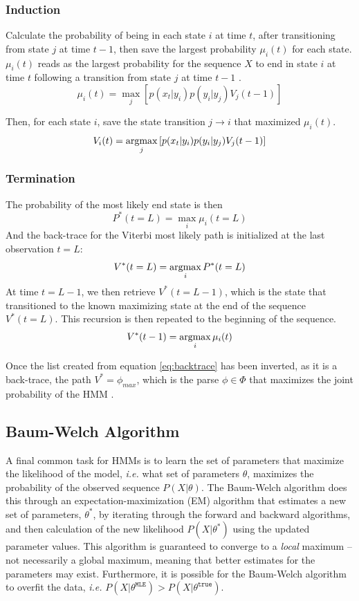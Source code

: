 \subsubsection{Induction}
Calculate the probability of being in each state $i$ at time $t$, after transitioning from state $j$ at time $t-1$, then save the largest probability $\mu_i(t)$ for each state. $\mu_i(t)$ reads as the largest probability for the sequence $X$ to end in state $i$ at time $t$ following a transition from state $j$ at time $t-1$ \cite{Rabiner1989ARecognition}. 
\begin{equation}
    \mu_i(t) =\max_j\left[p(x_t|y_i)p(y_i|y_j)V_j(t-1)\right]
\label{eq:fwdinduc}
\end{equation}

Then, for each state $i$, save the state transition $j\rightarrow i$ that maximized $\mu_i(t)$.  
$$V_i(t) =\operatorname*{argmax}_j\left[p(x_t|y_i)p(y_i|y_j)V_j(t-1)\right]$$

\subsubsection{Termination}
The probability of the most likely end state is then
\begin{equation}
    P^*(t=L) = \max_i{\mu_i(t=L)}
\label{eq:fwdterm}
\end{equation}
And the back-trace for the Viterbi most likely path is initialized at the last observation $t=L$:
$$V^*(t=L) = \operatorname*{argmax}_i{P^*(t=L)}$$
At time $t=L-1$, we then retrieve $V^*(t=L-1)$, which is the state that transitioned to the known maximizing state at the end of the sequence $V^*(t=L)$. This recursion is then repeated to the beginning of the sequence.
\begin{equation}
V^*(t-1) = \operatorname*{argmax}_i{\mu_i(t)}
\label{eq:backtrace}    
\end{equation}

Once the list created from equation \ref{eq:backtrace} has been inverted, as it is a back-trace, the path $V^* = \phi_{max}$, which is the parse $\phi \in \Phi$ that maximizes the joint probability of the HMM \cite{Rabiner1989ARecognition}.

\subsection{Baum-Welch Algorithm}
A final common task for HMMs is to learn the set of parameters that maximize the likelihood of the model, \textit{i.e.} what set of parameters $\theta$, maximizes the probability of the observed sequence $P(X|\theta)$. The Baum-Welch algorithm does this through an expectation-maximization (EM) algorithm that estimates a new set of parameters, $\theta^*$, by iterating through the forward and backward algorithms, and then calculation of the new likelihood $P(X|\theta^*)$ using the updated parameter values. This algorithm is guaranteed to converge to a \textit{local} maximum -- not necessarily a global maximum, meaning that better estimates for the parameters may exist. Furthermore, it is possible for the Baum-Welch algorithm to overfit the data, \textit{i.e.} $P(X|\theta^{\texttt{MLE}}) > P(X|\theta^{\texttt{true}})$. 

